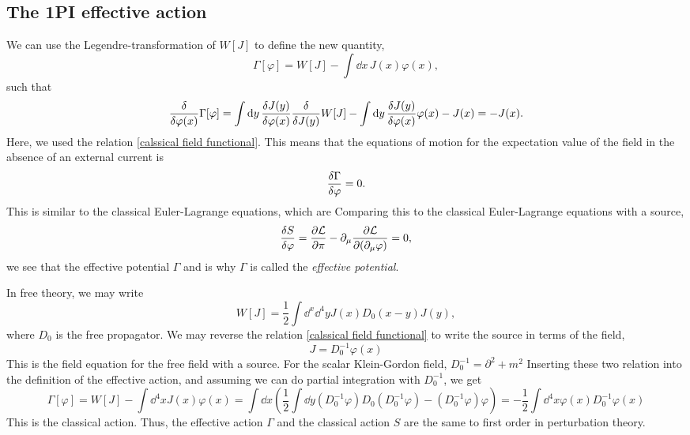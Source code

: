 \subsection{The 1PI effective action}
We can use the Legendre-transformation of $W[J]$ to define the new quantity,
\begin{equation}
    \Gamma[\varphi]
    = W[J] - \int \dd x \, J(x) \varphi(x), 
\end{equation}
such that
\begin{equation}
    \fdv{\varphi(x)} \Gamma[\varphi]
    = \int \dd y \, \fdv{J(y)}{\varphi(x)} \fdv{J(y)} W[J]
    - \int \dd y \, \fdv{J(y)}{\varphi(x)} \varphi(x)
    - J(x)
    = - J(x).
\end{equation}
Here, we used the relation \autoref{calssical field functional}.
This means that the equations of motion for the expectation value of the field in the absence of an external current is
\begin{equation}
    \fdv{\Gamma}{\varphi} = 0.
\end{equation}
This is similar to the classical Euler-Lagrange equations, which are
Comparing this to the classical Euler-Lagrange equations with a source,
\begin{equation}
    \fdv{S}{\varphi} = \pdv{\Ell}{\pi} - \partial_\mu \pdv{\Ell}{(\partial_\mu \varphi)} = 0,
\end{equation}
we see that the effective potential $\Gamma$
and is why $\Gamma$ is called the \emph{effective potential}.

In free theory, we may write
\begin{equation}
    W[J] = \frac{1}{2} \int \dd^x \dd^4y J(x) D_0(x - y) J(y),
\end{equation}
where $D_0$ is the free propagator.
We may reverse the relation \autoref{calssical field functional} to write the source in terms of the field,
\begin{equation}
    J = D_0^{-1} \varphi(x)
\end{equation}
This is the field equation for the free field with a source.
For the scalar Klein-Gordon field, $D_0^{-1} = \partial^2 + m^2$
Inserting these two relation into the definition of the effective action, and assuming we can do partial integration with $D_0^{-1}$, we get
\begin{equation}
    \Gamma[\varphi] = W[J] - \int \dd^4x J(x)\varphi(x)
    = 
    \int \dd x( 
        \frac{1}{2}\int \dd y (D_0^{-1} \varphi ) D_0 (D_0^{-1} \varphi ) 
        - (D_0^{-1} \varphi ) \varphi
        )
    = - \frac{1}{2} \int \dd^4 x \varphi(x) D_0^{-1} \varphi(x)
\end{equation}
This is the classical action.
Thus, the effective action $\Gamma$ and the classical action $S$ are the same to first order in perturbation theory.

